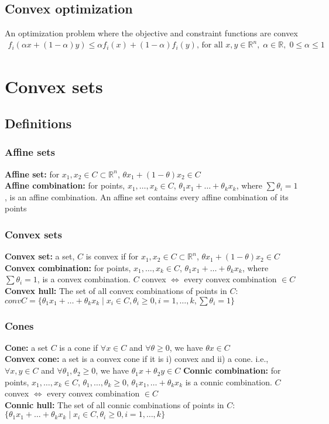 \documentclass{article}
\begin{document}
\subsection{Convex optimization}
An optimization problem where the objective and constraint functions are convex
\begin{align*}
  f_i(\alpha x + (1-\alpha) y) \leq \alpha f_i(x) + (1 - \alpha) f_i(y) \textrm{, for all } x,y \in \mathbb{R}^n, \; \alpha \in \mathbb{R}, \; 0 \leq \alpha \leq 1
\end{align*}

\section{Convex sets}
\subsection{Definitions}
\subsubsection{Affine sets}
\textbf{Affine set:} for $x_1, x_2 \in C \subset \mathbb{R}^n$, $\theta x_1 + (1-\theta)x_2 \in C$\\
\textbf{Affine combination:} for points, $x_1, \dots, x_k \in C$, $\theta_1x_1 + \dots + \theta_kx_k$, where $\sum \theta_i = 1$, is an affine combination. An affine set contains every affine combination of its points

\subsubsection{Convex sets}
\textbf{Convex set:} a set, $C$ is convex if for $x_1, x_2 \in C \subset \mathbb{R}^n$, $\theta x_1 + (1-\theta)x_2 \in C$\\
\textbf{Convex combination:} for points, $x_1, \dots, x_k \in C$, $\theta_1x_1 + \dots + \theta_kx_k$, where $\sum \theta_i = 1$, is a convex combination. $C$ convex $\Leftrightarrow$ every convex combination $\in C$\\
\textbf{Convex hull:} The set of all convex combinations of points in $C$: $convC=\{\theta_1x_1+\dots+\theta_kx_k \mid x_i \in C, \theta_i \geq 0, i=1,\dots,k, \sum \theta_i = 1 \}$

\subsubsection{Cones}
\textbf{Cone:} a set $C$ is a cone if $\forall x \in C$ and $\forall \theta \geq 0$, we have $\theta x \in C$\\
\textbf{Convex cone:} a set is a convex cone if it is i) convex and ii) a cone. i.e., $\forall x,y \in C$ and $\forall \theta_1, \theta_2 \geq 0$, we have $\theta_1x + \theta_2y \in C$
\textbf{Connic combination:} for points, $x_1, \dots, x_k \in C$, $\theta_1, \dots, \theta_k \geq 0$, $\theta_1x_1, \dots + \theta_kx_k$ is a connic combination. $C$ convex $\Leftrightarrow$ every convex combination $\in C$\\
\textbf{Connic hull:} The set of all connic combinations of points in $C$: $\{\theta_1x_1+\dots+\theta_kx_k \mid x_i \in C, \theta_i \geq 0, i=1,\dots,k\}$
\end{document}
